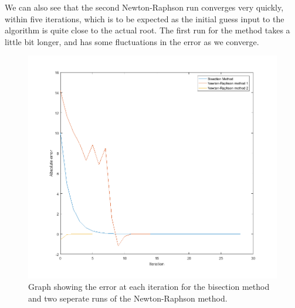 \documentclass[a4paper,12pt]{UoBnote}
\begin{document}
We can also see that the second Newton-Raphson run converges very quickly, within five iterations, which is to be expected as the initial guess input to the algorithm is quite close to the actual root. The first run for the method takes a little bit longer, and has some fluctuations in the error as we converge. 

\begin{figure}
	\centering
	\includegraphics[scale=0.75]{errorgraph}
	\caption{Graph showing the error at each iteration for the bisection method and two seperate runs of the Newton-Raphson method.}
	\label{fig:errorgraph}
\end{figure}

\clearpage
\printbibliography[heading=bibintoc]
\end{document}

